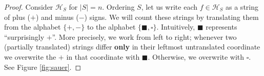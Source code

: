 \documentclass[twocolumn, 11pt]{article}
\newcommand{\Hh}{\mathcal{H}}
\theoremstyle{definition}
\begin{document}
            \newcommand{\rR}[1]{{\color{moor}#1}}
            \newcommand{\gG}[1]{{\color{moog}#1}}
            \newcommand{\bB}[1]{{\color{moob}#1}}
            \newcommand{\mE}{\texttt{$\square$}}
            \newcommand{\mD}{\texttt{$\blacksquare$}}
            \newcommand{\mA}{\texttt{$\bm{+}$}}
            \newcommand{\mM}{\texttt{$\bm{-}$}}


        \begin{proof}
            Consider $\Hh_S$ for $|S|=n$.  Ordering $S$, let us write each
            $f\in \Hh_S$ as a string of plus ($+$) and minus ($-$) signs.  We
            will count these strings by translating them from the alphabet
            $\{+,-\}$ to the alphabet $\{\blacksquare,\square\}$.
            Intuitively, $\blacksquare$ represents ``surprisingly $+$''.  More
            precisely, we work from left to right; whenever two (partially
            translated) strings differ \textbf{only} in their leftmost
            untranslated coordinate we overwrite the $+$ in that coordinate
            with $\blacksquare$.  Otherwise, we overwrite with $\square$.
            See Figure \ref{fig:sauer}.


\end{proof}
\end{document}
